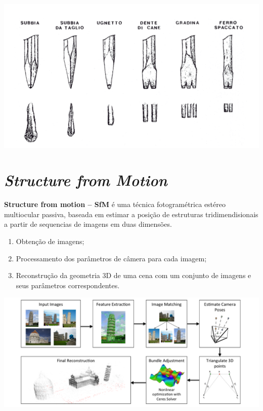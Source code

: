 \documentclass[table, usenames, svgnames, xcolor=dvipsnames]{beamer}
\begin{document}
\begin{frame} 
	\begin{center}
		\includegraphics[width=0.7\linewidth]{figs/ferramentasMich.png}
	\end{center}
\end{frame}

\section{\emph{Structure from Motion}}

\begin{frame}
	\begin{center}
	\textbf{Structure from motion -- SfM} é uma técnica fotogramétrica estéreo multiocular passiva, baseada em estimar a posição de estruturas tridimendisionais  a partir de sequencias de imagens em duas dimensões. 
	\end{center}
\end{frame}

\begin{frame}
	\begin{center}
		\begin{enumerate}
			\item{Obtenção de imagens;}
			\item{Processamento dos parâmetros de câmera para cada imagem;}
			\item{Reconstrução da geometria 3D de uma cena com um conjunto de imagens e seus parâmetros correspondentes.}
		\end{enumerate}
	\end{center}
\end{frame}

\begin{frame}
	\begin{center}
		\includegraphics[width=1\linewidth]{figs/pipelinesfm.png}
	\end{center}
\end{frame}
\end{document}
